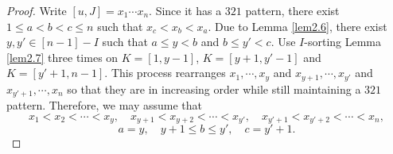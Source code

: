 \documentclass[12pt]{amsart}
\theoremstyle{definition}
\theoremstyle{remark}
\begin{document}
\begin{proof}
Write $[u,J] = x_1 \cdots x_n$. Since it has a $321$ pattern, there exist $1 \leq a < b < c \leq n$ such that $x_c < x_b < x_a$. Due to Lemma \ref{lem2.6}, there exist $y , y' \in [n-1]-I$ such that $a \leq y < b$ and $b \leq y' < c$. Use $I$-sorting Lemma \ref{lem2.7} three times on $K = [1,y-1]$, $K=[y+1 , y'-1] $ and $K=[y'+1 , n-1]$. This process rearranges $x_1 , \cdots , x_{y}$ and $x_{y+1} , \cdots , x_{y'}$ and  $x_{y'+1} , \cdots , x_n$ so that they are in increasing order while still maintaining a $321$ pattern. Therefore, we may assume that
\begin{equation}\label{eqn4.27}
x_1 < x_2 < \cdots < x_y , \quad x_{y+1} < x_{y+2} < \cdots < x_{y'} , \quad x_{y'+1} < x_{y'+2} < \cdots < x_n,
\end{equation}
\begin{equation}\label{eqn4.28}
a = y , \quad y+1 \leq b \leq y' ,\quad c=y'+1.
\end{equation}


\end{proof}
\end{document}
